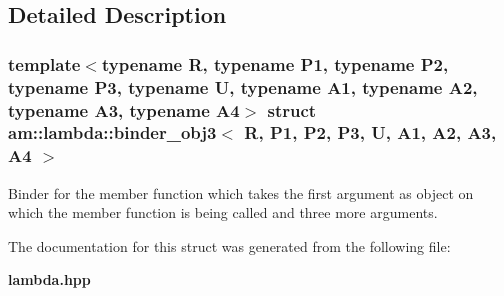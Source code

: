 \subsection{Detailed Description}
\subsubsection*{template$<$typename R, typename P1, typename P2, typename P3, typename U, typename A1, typename A2, typename A3, typename A4$>$ struct am::lambda::binder\_\-obj3$<$ R, P1, P2, P3, U, A1, A2, A3, A4 $>$}

Binder for the member function which takes the first argument as object on which the member function is being called and three more arguments. 



The documentation for this struct was generated from the following file:\begin{CompactItemize}
\item 
{\bf lambda.hpp}\end{CompactItemize}
